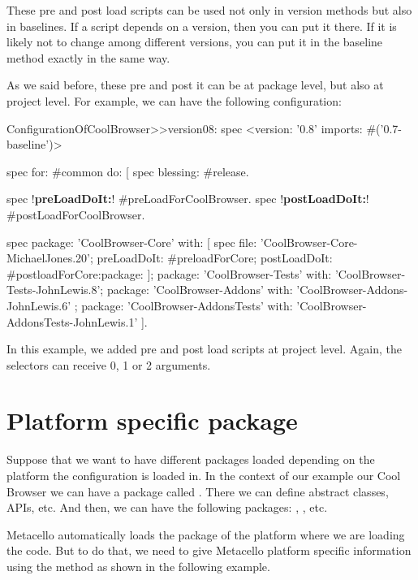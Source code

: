 \documentclass[a4paper,10pt,twoside]{book}
\begin{document}
These pre and post load scripts can be used not only in version methods but also in baselines. If a script depends on a version, then you can put it there. If it is likely not to change among different versions, you can put it in the baseline method exactly in the same way.

As we said before, these pre and post it can be at package level, but also at project level. For example, we can have the following configuration:

\begin{code}{} 
ConfigurationOfCoolBrowser>>version08: spec 
	<version: '0.8' imports: #('0.7-baseline')>
	
	spec for: #common do: [
		spec blessing: #release.
		
		spec !\textbf{preLoadDoIt:}! #preLoadForCoolBrowser.
		spec !\textbf{postLoadDoIt:}! #postLoadForCoolBrowser.
	
		spec 
			package: 'CoolBrowser-Core' with: [
				spec 
					file: 'CoolBrowser-Core-MichaelJones.20';
					preLoadDoIt: #preloadForCore;
					postLoadDoIt: #postloadForCore:package: ];
			package: 'CoolBrowser-Tests' with: 'CoolBrowser-Tests-JohnLewis.8';
			package: 'CoolBrowser-Addons' with: 'CoolBrowser-Addons-JohnLewis.6' ;
			package: 'CoolBrowser-AddonsTests' with: 'CoolBrowser-AddonsTests-JohnLewis.1' ].
\end{code}

In this example, we added pre and post load scripts at project level. Again, the selectors can receive 0, 1 or 2 arguments. 


\section {Platform specific package}

Suppose that we want to have different packages loaded depending on the platform the configuration is loaded in. In the context of our example our Cool Browser we can have a package called . There we can define abstract classes, APIs, etc. And then, we can have the following packages: , , etc.

Metacello automatically loads the package of the platform where we are loading the code. But to do that, we need to give Metacello  platform specific information using the method  as shown in the following example.
\end{document}

